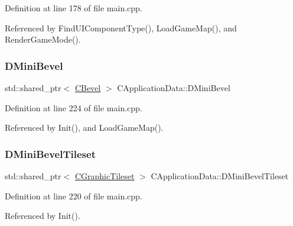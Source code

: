 Definition at line 178 of file main.\+cpp.



Referenced by Find\+U\+I\+Component\+Type(), Load\+Game\+Map(), and Render\+Game\+Mode().

\hypertarget{classCApplicationData_ad6718b216878d9fe05b26cd24b89c6ee}{}\label{classCApplicationData_ad6718b216878d9fe05b26cd24b89c6ee} 
\subsubsection{\texorpdfstring{D\+Mini\+Bevel}{DMiniBevel}}
{\footnotesize\ttfamily std\+::shared\+\_\+ptr$<$ \hyperlink{classCBevel}{C\+Bevel} $>$ C\+Application\+Data\+::\+D\+Mini\+Bevel\hspace{0.3cm}{\ttfamily [protected]}}



Definition at line 224 of file main.\+cpp.



Referenced by Init(), and Load\+Game\+Map().

\hypertarget{classCApplicationData_a74527a373eef061540615e61928f9706}{}\label{classCApplicationData_a74527a373eef061540615e61928f9706} 
\subsubsection{\texorpdfstring{D\+Mini\+Bevel\+Tileset}{DMiniBevelTileset}}
{\footnotesize\ttfamily std\+::shared\+\_\+ptr$<$ \hyperlink{classCGraphicTileset}{C\+Graphic\+Tileset} $>$ C\+Application\+Data\+::\+D\+Mini\+Bevel\+Tileset\hspace{0.3cm}{\ttfamily [protected]}}



Definition at line 220 of file main.\+cpp.



Referenced by Init().

\hypertarget{classCApplicationData_aa7d7e4c8be514246089546f4d98d74f2}{}\label{classCApplicationData_aa7d7e4c8be514246089546f4d98d74f2} 

